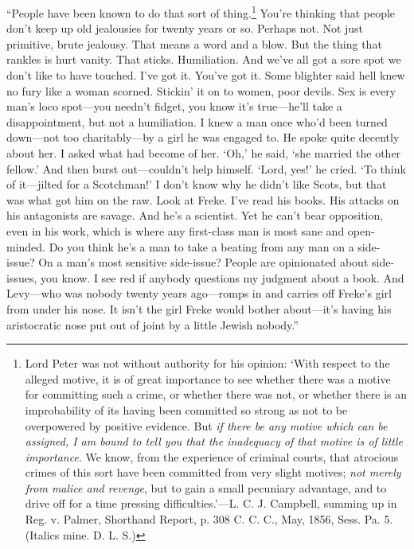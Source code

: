 \enquote{People have been known to do that sort of thing.\footnote{Lord Peter was not without authority for his opinion: \enquote{With respect to the alleged motive, it is of great importance to see whether there was a motive for committing such a crime, or whether there was not, or whether there is an improbability of its having been committed so strong as not to be overpowered by positive evidence. But \textit{if there be any motive which can be assigned, I am bound to tell you that the inadequacy of that motive is of little importance}. We know, from the experience of criminal courts, that atrocious crimes of this sort have been committed from very slight motives; \textit{not merely from malice and revenge}, but to gain a small pecuniary advantage, and to drive off for a time pressing difficulties.}—L. C. J. Campbell, summing up in Reg. v. Palmer, Shorthand Report, p. 308 C. C. C., May, 1856, Sess. Pa. 5. (Italics mine. D. L. S.)} You’re thinking that people don’t keep up old jealousies for twenty years or so. Perhaps not. Not just primitive, brute jealousy. That means a word and a blow. But the thing that rankles is hurt vanity. That sticks. Humiliation. And we’ve all got a sore spot we don’t like to have touched. I’ve got it. You’ve got it. Some blighter said hell knew no fury like a woman scorned. Stickin’ it on to women, poor devils. Sex is every man’s loco spot\allowbreak---\allowbreak you needn’t fidget, you know it’s true\allowbreak---\allowbreak he’ll take a disappointment, but not a humiliation. I knew a man once who’d been turned down\allowbreak---\allowbreak not too charitably\allowbreak---\allowbreak by a girl he was engaged to. He spoke quite decently about her. I asked what had become of her. \enquote{Oh,} he said, \enquote{she married the other fellow.} And then burst out\allowbreak---\allowbreak couldn’t help himself. \enquote{Lord, yes!} he cried. \enquote{To think of it\allowbreak---\allowbreak jilted for a Scotchman!} I don’t know why he didn’t like Scots, but that was what got him on the raw. Look at Freke. I’ve read his books. His attacks on his antagonists are savage. And he’s a scientist. Yet he can’t bear opposition, even in his work, which is where any first-class man is most sane and open-minded. Do you think he’s a man to take a beating from any man on a side-issue? On a man’s most sensitive side-issue? People are opinionated about side-issues, you know. I see red if anybody questions my judgment about a book. And Levy\allowbreak---\allowbreak who was nobody twenty years ago\allowbreak---\allowbreak romps in and carries off Freke’s girl from under his nose. It isn’t the girl Freke would bother about\allowbreak---\allowbreak it’s having his aristocratic nose put out of joint by a little Jewish nobody.}

